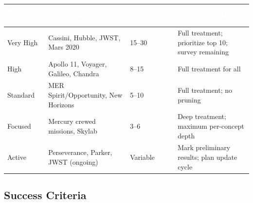 \documentclass[11pt,letterpaper]{article}
\newcommand{\tableheader}[1]{\textbf{\sffamily\textcolor{white}{#1}}}
\begin{document}
\begin{center}
\begin{tabularx}{\textwidth}{L{2.5cm}L{3.5cm}L{2.5cm}X}
\toprule
{}
\tableheader{Science Volume} & \tableheader{Mission Examples} & \tableheader{Expected Concepts} & \tableheader{Calibration Action} \\
\midrule
Very High & Cassini, Hubble, JWST, Mars 2020 & 15--30 & Full treatment; prioritize top 10; survey remaining \\
High & Apollo 11, Voyager, Galileo, Chandra & 8--15 & Full treatment for all \\
Standard & MER Spirit/Opportunity, New Horizons & 5--10 & Full treatment; no pruning \\
Focused & Mercury crewed missions, Skylab & 3--6 & Deep treatment; maximum per-concept depth \\
Active & Perseverance, Parker, JWST (ongoing) & Variable & Mark preliminary results; plan update cycle \\
\bottomrule
\end{tabularx}
\end{center}

\subsection{Success Criteria}
\end{document}

